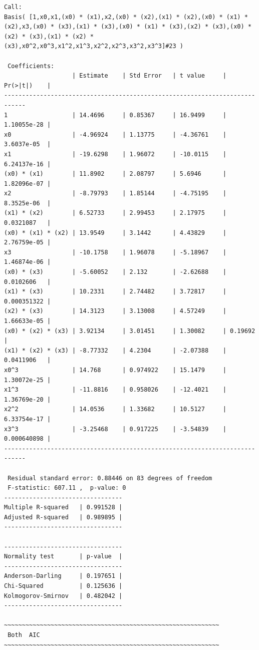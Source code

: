 \begin{lstlisting}[style=output,basicstyle=\tiny]
 Call:
Basis( [1,x0,x1,(x0) * (x1),x2,(x0) * (x2),(x1) * (x2),(x0) * (x1) * (x2),x3,(x0) * (x3),(x1) * (x3),(x0) * (x1) * (x3),(x2) * (x3),(x0) * (x2) * (x3),(x1) * (x2) * (x3),x0^2,x0^3,x1^2,x1^3,x2^2,x2^3,x3^2,x3^3]#23 )

 Coefficients:
                   | Estimate    | Std Error   | t value     | Pr(>|t|)    | 
----------------------------------------------------------------------------
1                  | 14.4696     | 0.85367     | 16.9499     | 1.10055e-28 | 
x0                 | -4.96924    | 1.13775     | -4.36761    | 3.6037e-05  | 
x1                 | -19.6298    | 1.96072     | -10.0115    | 6.24137e-16 | 
(x0) * (x1)        | 11.8902     | 2.08797     | 5.6946      | 1.82096e-07 | 
x2                 | -8.79793    | 1.85144     | -4.75195    | 8.3525e-06  | 
(x1) * (x2)        | 6.52733     | 2.99453     | 2.17975     | 0.0321087   | 
(x0) * (x1) * (x2) | 13.9549     | 3.1442      | 4.43829     | 2.76759e-05 | 
x3                 | -10.1758    | 1.96078     | -5.18967    | 1.46874e-06 | 
(x0) * (x3)        | -5.60052    | 2.132       | -2.62688    | 0.0102606   | 
(x1) * (x3)        | 10.2331     | 2.74482     | 3.72817     | 0.000351322 | 
(x2) * (x3)        | 14.3123     | 3.13008     | 4.57249     | 1.66633e-05 | 
(x0) * (x2) * (x3) | 3.92134     | 3.01451     | 1.30082     | 0.19692     | 
(x1) * (x2) * (x3) | -8.77332    | 4.2304      | -2.07388    | 0.0411906   | 
x0^3               | 14.768      | 0.974922    | 15.1479     | 1.30072e-25 | 
x1^3               | -11.8816    | 0.958026    | -12.4021    | 1.36769e-20 | 
x2^2               | 14.0536     | 1.33682     | 10.5127     | 6.33754e-17 | 
x3^3               | -3.25468    | 0.917225    | -3.54839    | 0.000640898 | 
----------------------------------------------------------------------------

 Residual standard error: 0.88446 on 83 degrees of freedom 
 F-statistic: 607.11 ,  p-value: 0
---------------------------------
Multiple R-squared   | 0.991528 | 
Adjusted R-squared   | 0.989895 | 
---------------------------------

---------------------------------
Normality test       | p-value  | 
---------------------------------
Anderson-Darling     | 0.197651 | 
Chi-Squared          | 0.125636 | 
Kolmogorov-Smirnov   | 0.482042 | 
---------------------------------

~~~~~~~~~~~~~~~~~~~~~~~~~~~~~~~~~~~~~~~~~~~~~~~~~~~~~~~~~~~~
 Both  AIC 
~~~~~~~~~~~~~~~~~~~~~~~~~~~~~~~~~~~~~~~~~~~~~~~~~~~~~~~~~~~~


\end{lstlisting}
